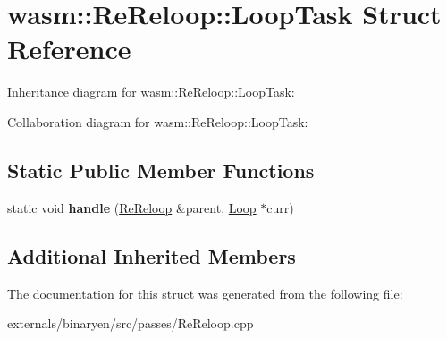 \hypertarget{structwasm_1_1_re_reloop_1_1_loop_task}{}\section{wasm\+:\+:Re\+Reloop\+:\+:Loop\+Task Struct Reference}
\label{structwasm_1_1_re_reloop_1_1_loop_task}


Inheritance diagram for wasm\+:\+:Re\+Reloop\+:\+:Loop\+Task\+:


Collaboration diagram for wasm\+:\+:Re\+Reloop\+:\+:Loop\+Task\+:
\subsection*{Static Public Member Functions}
\begin{DoxyCompactItemize}
\item 
\mbox{\label{structwasm_1_1_re_reloop_1_1_loop_task_a6dc64baf027f31229abc5d90a1e013c1}} 
static void {\bfseries handle} (\mbox{\hyperlink{structwasm_1_1_re_reloop}{Re\+Reloop}} \&parent, \mbox{\hyperlink{classwasm_1_1_loop}{Loop}} $\ast$curr)
\end{DoxyCompactItemize}
\subsection*{Additional Inherited Members}


The documentation for this struct was generated from the following file\+:\begin{DoxyCompactItemize}
\item 
externals/binaryen/src/passes/Re\+Reloop.\+cpp\end{DoxyCompactItemize}
